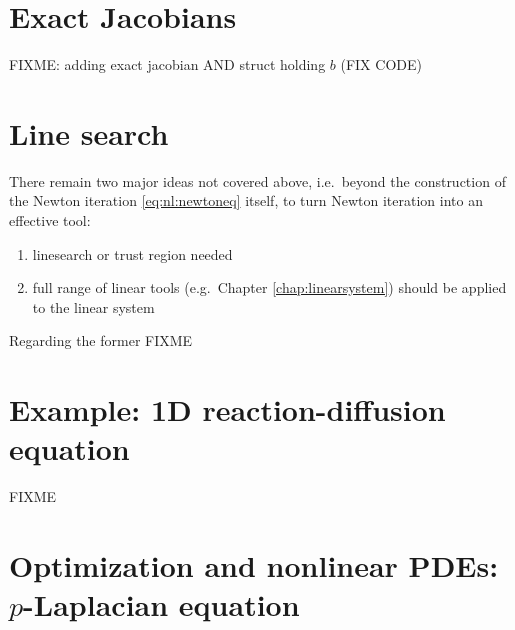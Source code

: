 \section{Exact Jacobians}

FIXME: adding exact jacobian AND struct holding $b$ (FIX CODE)




\section{Line search}

There remain two major ideas not covered above, i.e.~beyond the construction of the Newton iteration \eqref{eq:nl:newtoneq} itself, to turn Newton iteration into an effective tool:
\renewcommand{\labelenumi}{\roman{enumi})}
\begin{enumerate}
\item linesearch or trust region needed \citep{Kelley2003}
\item full range of linear tools (e.g.~Chapter \ref{chap:linearsystem}) should be applied to the linear system
\end{enumerate}

Regarding the former FIXME


\section{Example: 1D reaction-diffusion equation}

FIXME

\vfill
{}




\section{Optimization and nonlinear PDEs: $p$-Laplacian equation}

